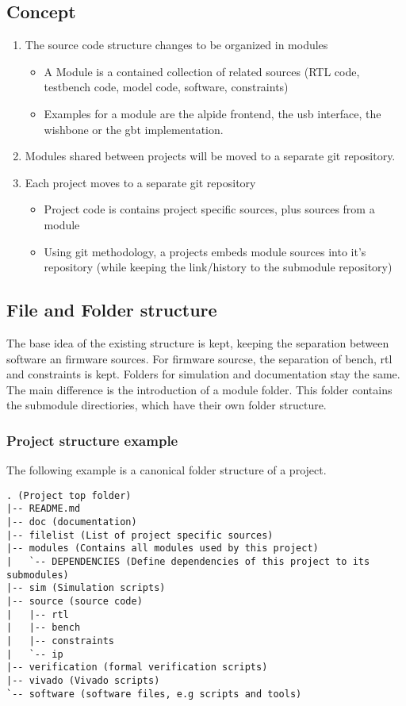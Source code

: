 \documentclass{scrartcl}
\begin{document}
\subsection{Concept}
\begin{enumerate}
\item The source code structure changes to be organized in modules
  \begin{itemize}
  \item A Module is a contained collection of related sources (RTL
    code, testbench code, model code, software, constraints)
  \item Examples for a module are the alpide frontend, the usb
    interface, the wishbone or the gbt implementation.
  \end{itemize}
\item Modules shared between projects will be moved to a separate git
  repository.
\item Each project moves to a separate git repository
  \begin{itemize}
  \item Project code is contains project specific sources, plus
    sources from a module
\item Using git methodology, a projects embeds module sources into
  it's repository (while keeping the link/history to the submodule
  repository)
\end{itemize}
\end{enumerate}

\subsection{File and Folder structure}
The base idea of the existing structure is kept, keeping the
separation between software an firmware sources. For firmware sourcse,
the separation of bench, rtl and constraints is kept. Folders for
simulation and documentation stay the same. The main difference is the
introduction of a module folder. This folder contains the submodule
directiories, which have their own folder structure.

\subsubsection{Project structure example}
The following example is a canonical folder structure of a project.
\begin{verbatim}
. (Project top folder)
|-- README.md
|-- doc (documentation)
|-- filelist (List of project specific sources)
|-- modules (Contains all modules used by this project)
|   `-- DEPENDENCIES (Define dependencies of this project to its submodules)
|-- sim (Simulation scripts)
|-- source (source code)
|   |-- rtl
|   |-- bench
|   |-- constraints
|   `-- ip
|-- verification (formal verification scripts)
|-- vivado (Vivado scripts)
`-- software (software files, e.g scripts and tools)
\end{verbatim}
\end{document}
